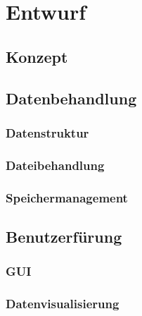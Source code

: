 \chapter{Entwurf}


\section{Konzept}

\section{Datenbehandlung}

\subsection{Datenstruktur}

\subsection{Dateibehandlung}

\subsection{Speichermanagement}


\section{Benutzerf\"urung}

\subsection{\ac{GUI}}

\subsection{Datenvisualisierung}

